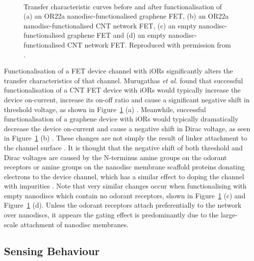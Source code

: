 \documentclass[
  a4paper,
]{scrbook}
\begin{document}
\begin{figure}
\begin{minipage}[t]{0.01\linewidth}
{\centering 

~

}

\end{minipage}%

\caption{\label{fig-functionalisation-literature}Transfer characteristic
curves before and after functionalisation of (a) an OR22a
nanodisc-functionalised graphene FET, (b) an OR22a
nanodisc-functionalised CNT network FET, (c) an empty
nanodisc-functionalised graphene FET and (d) an empty
nanodisc-functionalised CNT network FET. Reproduced with permission from
\autocite{Murugathas2019a,Murugathas2020}.}

\end{figure}

Functionalisation of a FET device channel with iORs significantly alters
the transfer characteristics of that channel. Murugathas \emph{et al.}
found that successful functionalisation of a CNT FET device with iORs
would typically increase the device on-current, increase its on-off
ratio and cause a significant negative shift in threshold voltage, as
shown in Figure~\ref{fig-functionalisation-literature} (a)
\autocite{Murugathas2019a}. Meanwhile, successful functionalisation of a
graphene device with iORs would typically dramatically decrease the
device on-current and cause a negative shift in Dirac voltage, as seen
in Figure~\ref{fig-functionalisation-literature} (b)
\autocite{Murugathas2020}. These changes are not simply the result of
linker attachment to the channel surface \autocite{Murugathas2019a}. It
is thought that the negative shift of both threshold and Dirac voltages
are caused by the N-terminus amine groups on the odorant receptors or
amine groups on the nanodisc membrane scaffold proteins donating
electrons to the device channel, which has a similar effect to doping
the channel with impurities
\autocite{Bradley2004,Murugathas2019a,Murugathas2020}. Note that very
similar changes occur when functionalising with empty nanodiscs which
contain no odorant receptors, shown in
Figure~\ref{fig-functionalisation-literature} (c) and
Figure~\ref{fig-functionalisation-literature} (d). Unless the odorant
receptors attach preferentially to the network over nanodiscs, it
appears the gating effect is predominantly due to the large-scale
attachment of nanodisc membranes.

\hypertarget{sensing-behaviour-1}{%
\subsection{Sensing Behaviour}\label{sensing-behaviour-1}}
\end{document}
